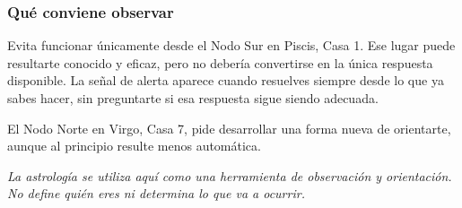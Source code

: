 \documentclass[11pt,a4paper]{article}
\begin{document}
\subsubsection*{Qué conviene observar}
Evita funcionar únicamente desde el Nodo Sur en Piscis, Casa 1. Ese lugar puede resultarte conocido y eficaz, pero no debería convertirse en la única respuesta disponible. La señal de alerta aparece cuando resuelves siempre desde lo que ya sabes hacer, sin preguntarte si esa respuesta sigue siendo adecuada.

El Nodo Norte en Virgo, Casa 7, pide desarrollar una forma nueva de orientarte, aunque al principio resulte menos automática.

\vspace{1cm}

\begin{center}
{\small\itshape\color{grisai}
La astrología se utiliza aquí como una herramienta de observación y orientación.
No define quién eres ni determina lo que va a ocurrir.
}
\end{center}
\end{document}
